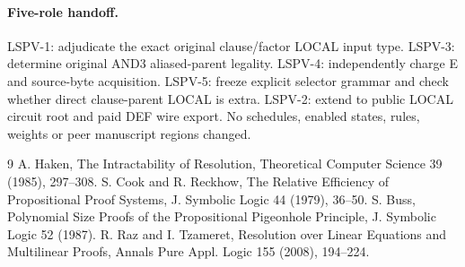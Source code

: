 \documentclass[11pt]{article}
\begin{document}
\paragraph{Five-role handoff.}
LSPV-1: adjudicate the exact original clause/factor LOCAL input type. LSPV-3: determine original AND3 aliased-parent legality. LSPV-4: independently charge E and source-byte acquisition. LSPV-5: freeze explicit selector grammar and check whether direct clause-parent LOCAL is extra. LSPV-2: extend to public LOCAL circuit root and paid DEF wire export. No schedules, enabled states, rules, weights or peer manuscript regions changed.

\begin{thebibliography}{9}
 A. Haken, The Intractability of Resolution, Theoretical Computer Science 39 (1985), 297--308.
 S. Cook and R. Reckhow, The Relative Efficiency of Propositional Proof Systems, J. Symbolic Logic 44 (1979), 36--50.
 S. Buss, Polynomial Size Proofs of the Propositional Pigeonhole Principle, J. Symbolic Logic 52 (1987).
 R. Raz and I. Tzameret, Resolution over Linear Equations and Multilinear Proofs, Annals Pure Appl. Logic 155 (2008), 194--224.
\end{thebibliography}
\end{document}
